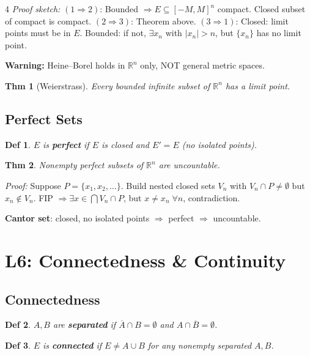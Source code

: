 \documentclass[9pt,landscape]{extarticle}
\newcommand{\R}{\mathbb{R}}
\theoremstyle{compact}
\newtheorem*{thm}{Thm}
\newtheorem*{defn}{Def}
\begin{document}
\begin{multicols}{4}
\textit{Proof sketch:} $(1 \Rightarrow 2)$: Bounded $\Rightarrow E \subseteq [-M,M]^n$ compact. Closed subset of compact is compact. $(2 \Rightarrow 3)$: Theorem above. $(3 \Rightarrow 1)$: Closed: limit points must be in $E$. Bounded: if not, $\exists x_n$ with $|x_n| > n$, but $\{x_n\}$ has no limit point.

\textbf{Warning:} Heine--Borel holds in $\R^n$ only, NOT general metric spaces.

\begin{thm}[Weierstrass]
Every bounded infinite subset of $\R^n$ has a limit point.
\end{thm}

\subsection{Perfect Sets}
\begin{defn}
$E$ is \textbf{perfect} if $E$ is closed and $E' = E$ (no isolated points).
\end{defn}

\begin{thm}
Nonempty perfect subsets of $\R^n$ are uncountable.
\end{thm}
\textit{Proof:} Suppose $P = \{x_1, x_2, \ldots\}$. Build nested closed sets $V_n$ with $V_n \cap P \neq \emptyset$ but $x_n \notin V_n$. FIP $\Rightarrow \exists x \in \bigcap V_n \cap P$, but $x \neq x_n\;\forall n$, contradiction.

\textbf{Cantor set}: closed, no isolated points $\Rightarrow$ perfect $\Rightarrow$ uncountable.

\section{L6: Connectedness \& Continuity}

\subsection{Connectedness}
\begin{defn}
$A, B$ are \textbf{separated} if $\overline{A} \cap B = \emptyset$ and $A \cap \overline{B} = \emptyset$.
\end{defn}

\begin{defn}
$E$ is \textbf{connected} if $E \neq A \cup B$ for any nonempty separated $A, B$.
\end{defn}


\end{multicols}
\end{document}
